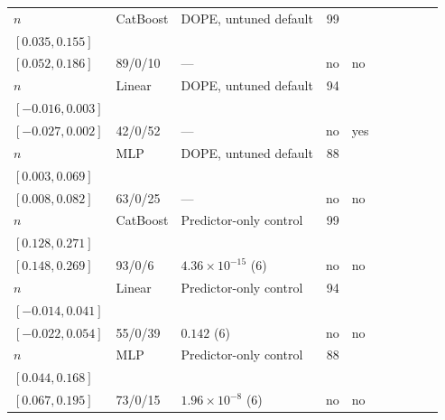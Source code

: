 \begin{longtable}{@{}ll>{\raggedright\arraybackslash}p{1.1in}rllrlll@{}}
$n$ & CatBoost & DOPE, untuned default & 99 & \begin{tabular}[t]{@{}l@{}}$0.101$\\\tiny$[0.035, 0.155]$\end{tabular} & \begin{tabular}[t]{@{}l@{}}$0.127$\\\tiny$[0.052, 0.186]$\end{tabular} & 89/0/10 & --- & no & no \\
$n$ & Linear & DOPE, untuned default & 94 & \begin{tabular}[t]{@{}l@{}}$-0.002$\\\tiny$[-0.016, 0.003]$\end{tabular} & \begin{tabular}[t]{@{}l@{}}$-0.007$\\\tiny$[-0.027, 0.002]$\end{tabular} & 42/0/52 & --- & no & yes \\
$n$ & MLP & DOPE, untuned default & 88 & \begin{tabular}[t]{@{}l@{}}$0.034$\\\tiny$[0.003, 0.069]$\end{tabular} & \begin{tabular}[t]{@{}l@{}}$0.050$\\\tiny$[0.008, 0.082]$\end{tabular} & 63/0/25 & --- & no & no \\
$n$ & CatBoost & Predictor-only control & 99 & \begin{tabular}[t]{@{}l@{}}$0.215$\\\tiny$[0.128, 0.271]$\end{tabular} & \begin{tabular}[t]{@{}l@{}}$0.214$\\\tiny$[0.148, 0.269]$\end{tabular} & 93/0/6 & $4.36\times 10^{-15}$ (6) & no & no \\
$n$ & Linear & Predictor-only control & 94 & \begin{tabular}[t]{@{}l@{}}$0.003$\\\tiny$[-0.014, 0.041]$\end{tabular} & \begin{tabular}[t]{@{}l@{}}$0.016$\\\tiny$[-0.022, 0.054]$\end{tabular} & 55/0/39 & $0.142$ (6) & no & no \\
$n$ & MLP & Predictor-only control & 88 & \begin{tabular}[t]{@{}l@{}}$0.106$\\\tiny$[0.044, 0.168]$\end{tabular} & \begin{tabular}[t]{@{}l@{}}$0.134$\\\tiny$[0.067, 0.195]$\end{tabular} & 73/0/15 & $1.96\times 10^{-8}$ (6) & no & no \\

\end{longtable}
